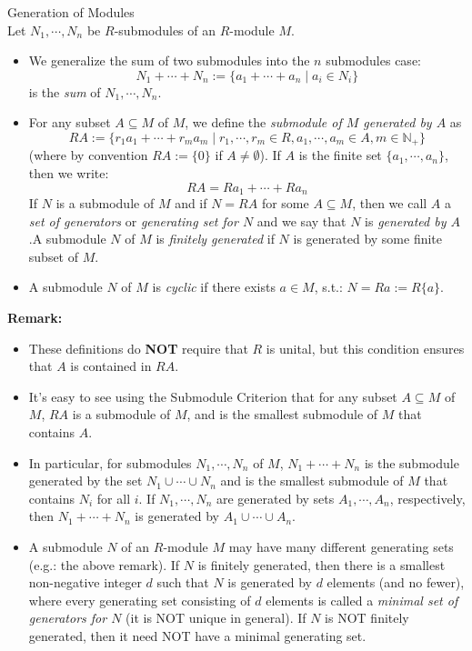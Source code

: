 \begin{definition}{Generation of Modules}\\
Let $N_1 ,\cdots, N_n$ be $R$-submodules of an $R$-module $M$.
\begin{itemize}
    \item We generalize the sum of two submodules into the $n$ submodules case:
    $$N_1 + \cdots +N_n:= \{ a_1 + \cdots + a_n \mid a_i\in N_i\}$$
    is the \textit{sum} of $N_1 ,\cdots, N_n$.

    \item For any subset $A \subseteq M$ of $M$, we define the \textit{submodule of $M$ generated by $A$} as
    $$RA:= \{r_1a_1 +\cdots+ r_ma_m \mid r_1,\cdots, r_m \in R, a_1 ,\cdots, a_m \in A, m\in \mathbb{N}_+\}$$
    (where by convention $RA:=\{0\}$ if $A\neq \emptyset$). If $A$ is the finite set $\{a_1 ,\cdots, a_n\}$, then we write:
    $$RA= Ra_1 +\cdots +Ra_n$$
    If $N$ is a submodule of $M$ and if $N=RA$ for some $A\subseteq M$, then we call $A$ a \textit{set of generators} or \textit{generating set for $N$} and we say that $N$ is \textit{generated by $A$}.A submodule $N$ of $M$ is \textit{finitely generated} if $N$ is generated by some finite subset of $M$.

    \item A submodule $N$ of $M$ is \textit{cyclic} if there exists $a\in M$, s.t.: $N= Ra:=R\{a\}$.
\end{itemize}
\end{definition}

\noindent\textbf{Remark:} \begin{itemize}
    \item These definitions do \textbf{NOT} require that $R$ is unital, but this condition ensures that $A$ is contained in $RA$.

    \item It's easy to see using the Submodule Criterion that for any subset $A \subseteq M$ of $M$, $RA$ is a submodule of $M$, and is the smallest submodule of $M$ that contains $A$.

    \item In particular, for submodules $N_1,\cdots,N_n$ of $M$, $N_1+\cdots +N_n$ is the submodule generated by the set $N_1 \cup \cdots \cup N_n$ and is the smallest submodule of $M$ that contains $N_i$ for all $i$. If $N_1 ,\cdots, N_n$ are generated by sets $A_1 ,\cdots, A_n$, respectively, then $N_1 +\cdots+ N_n$ is generated by $A_1 \cup \cdots \cup A_n$.

    \item A submodule $N$ of an $R$-module $M$ may have many different generating sets (e.g.: the above remark). If $N$ is finitely generated, then there is a smallest non-negative integer $d$ such that $N$ is generated by $d$ elements (and no fewer), where every generating set consisting of $d$ elements is called a \textit{minimal set of generators for $N$} (it is NOT unique in general). If $N$ is NOT finitely generated, then it need NOT have a minimal generating set.
\end{itemize}

